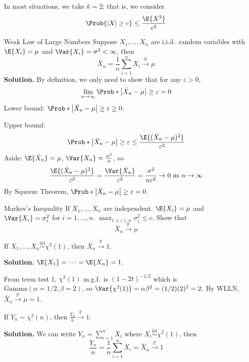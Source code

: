 In most situations, we take $ k=2 $; that is, we consider
\[ \Prob{\abs{X}\ge c}\le \frac{\E{X^2}}{c^2} \]
\begin{Example}{Weak Law of Large Numbers}{}
    Suppose $ X_1,\ldots,X_n $ are i.i.d.\ random variables
    with $ \E{X_i}=\mu $ and $ \Var{X_i}=\sigma^2<\infty $, then
    \[ \bar{X}_n=\frac{1}{n} \sum_{i=1}^{n} X_i\stackrel{\mathbb{P}}{\to}\mu \]
    \textbf{Solution.} By definition, we only need to show that
    for any $ \varepsilon>0 $,
    \[ \lim\limits_{{n} \to {\infty}} \Prob*{\abs*{\bar{X}_n-\mu}\ge \varepsilon}=0 \]
    Lower bound: $ \Prob*{\abs*{\bar{X}_n-\mu}\ge \varepsilon}\ge 0 $.

    Upper bound:
    \[ \Prob*{\abs*{\bar{X}_n-\mu}\ge \varepsilon}\le
        \frac{\E{(\bar{X}_n-\mu)^2}}{\varepsilon^2}  \]
    Aside: $ \E{\bar{X}_n}=\mu $, $ \Var{X_n}=\frac{\sigma^2}{n} $, so
    \[ \frac{\E{(\bar{X}_n-\mu)^2}}{\varepsilon^2}=
        \frac{\Var{\bar{X}_n}}{\varepsilon^2}=
        \frac{\sigma^2}{n\varepsilon^2}\to 0\text{ as }n\to\infty   \]
    By Squeeze Theorem, $ \Prob*{\abs*{\bar{X}_n-\mu}\ge \varepsilon}=0 $.
\end{Example}
\begin{Exercise}{Markov's Inequality}{}
    If $ X_1,\ldots,X_n $ are independent. $ \E{X_i}=\mu $
    and $ \Var{X_i}=\sigma_i^2 $ for $ i=1,\ldots,n $.
    $ \max_{1\le i\le n}\sigma_i^2\le c $.
    Show that
    \[ \bar{X}_n\stackrel{\mathbb{P}}{\to}\mu \]
\end{Exercise}
\begin{Example}{}{}
    If $ X_1,\ldots,X_n\stackrel{\text{iid}}{\sim}\chi^2(1) $,
    then $ \bar{X}_n\stackrel{\mathbb{P}}{\to}1 $.

    \textbf{Solution.} $ \E{X_1}=\cdots=\E{X_n}=1 $.

    From term test 1,
    $ \chi^2(1) $ m.g.f.\ is $ (1-2t)^{-1/2} $
    which is $ \text{Gamma}(\alpha=1/2,\beta=2) $,
    so $ \Var{\chi^2(1)}=\alpha\beta^2=(1/2)(2)^2=2 $. By
    WLLN, $ \bar{X}_n\stackrel{\mathbb{P}}{\to}\mu=1 $.
\end{Example}
\begin{Example}{}{}
    If $ Y_n \sim \chi^2(n) $, then $ \displaystyle \frac{Y_n}{n}
        \stackrel{\mathbb{P}}{\to} 1 $.

    \textbf{Solution.} We can write
    $ Y_n=\sum_{i=1}^{n} X_i $ where $ X_i\stackrel{\text{iid}}{\sim}\chi^2(1) $,
    then
    \[ \frac{Y_n}{n}=\frac{1}{n} \sum_{i=1}^{n} X_i=\bar{X}_n
        \stackrel{\mathbb{P}}{\to}1 \]
\end{Example}
